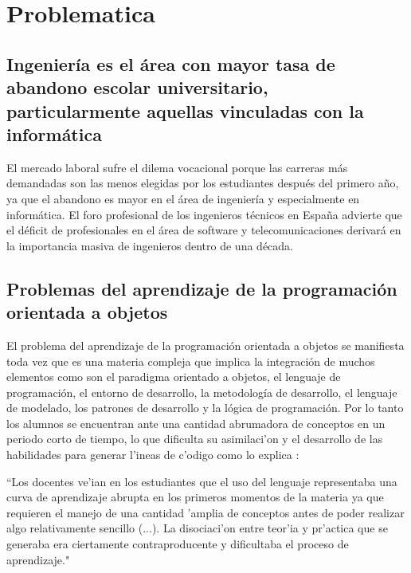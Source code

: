 \chapter{Problematica}

\section{Ingeniería es el área con mayor tasa de abandono escolar universitario, particularmente aquellas vinculadas con la informática}
El mercado laboral sufre el dilema vocacional porque las carreras más demandadas son las menos elegidas por los estudiantes después del primero año, ya que el abandono es mayor en el área de ingeniería y especialmente en informática. El foro profesional de los ingenieros técnicos en España advierte que el déficit de profesionales en el área de software y telecomunicaciones derivará en la importancia masiva de ingenieros dentro de una década.

\section{Problemas del aprendizaje de la programación orientada a objetos}
El problema del aprendizaje de la programación orientada a objetos se manifiesta toda vez que es una materia compleja que implica la integración de muchos elementos como son el paradigma orientado a objetos, el lenguaje de programación, el entorno de desarrollo, la metodología de desarrollo, el lenguaje de modelado, los patrones de desarrollo y la lógica de programación. Por lo tanto los alumnos se encuentran ante una cantidad abrumadora de conceptos en un periodo corto de tiempo, lo que dificulta su asimilaci'on y el desarrollo de las habilidades para generar l'ineas de c'odigo como lo explica \cite{spigariol2013ensenando}:

\begin{minipage}{0.9\linewidth}
	 \vspace{5pt}
	 \begin{small}
	 	``Los docentes ve'ian en los estudiantes que el uso del lenguaje representaba una curva de aprendizaje abrupta en los primeros momentos de la materia ya que requieren el manejo de una cantidad 'amplia de conceptos antes de poder realizar algo relativamente sencillo (...). La disociaci'on entre teor'ia y pr'actica que se generaba era ciertamente contraproducente y dificultaba el proceso de aprendizaje."
	 \end{small}
\end{minipage}

